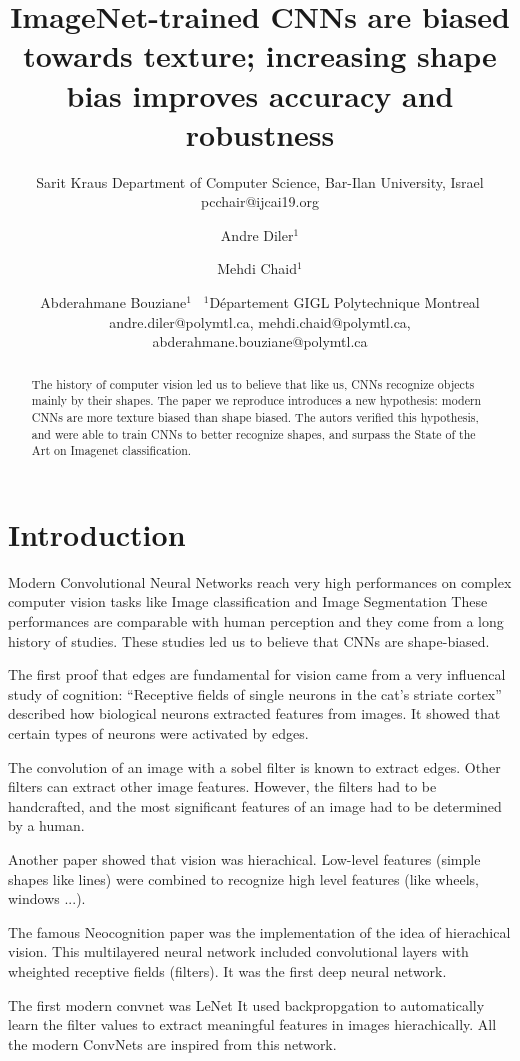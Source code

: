 \documentclass{article}
\title{ImageNet-trained CNNs are biased towards texture; increasing shape bias improves accuracy and robustness}
\author{
    Sarit Kraus
    \affiliations
    Department of Computer Science, Bar-Ilan University, Israel \emails
    pcchair@ijcai19.org
}
\author{
Andre Diler$^1$
\and
Mehdi Chaid$^1$\and
Abderahmane Bouziane$^1$\
\affiliations
$^1$Département GIGL Polytechnique Montreal\\
\emails
andre.diler@polymtl.ca,
mehdi.chaid@polymtl.ca,
abderahmane.bouziane@polymtl.ca
}
\begin{document}
\maketitle

\begin{abstract}
The history of computer vision led us to believe that like us, CNNs recognize 
objects mainly by their shapes. The paper we reproduce introduces a new hypothesis: modern
CNNs are more texture biased than shape biased. The autors verified this hypothesis, and were
able to train CNNs to better recognize shapes, and surpass the State of the Art on Imagenet classification.
\end{abstract}

\section{Introduction}


Modern Convolutional Neural Networks reach very high performances on complex computer vision tasks like
Image classification and Image Segmentation
These performances are comparable with human perception and they come from a long history of studies.
These studies led us to believe that CNNs are shape-biased.


The first proof that edges are fundamental for vision came from a very influencal study of cognition:
  “Receptive fields of single neurons in the cat’s striate cortex”
described how biological neurons extracted features from images. It showed that certain types of
neurons were activated by edges.

The convolution of an image with a sobel filter is known to extract edges.
Other filters can extract other image features. However, the filters had to be handcrafted, and
the most significant features of an image had to be determined by a human.

Another paper showed that vision was hierachical. Low-level features (simple shapes like lines)
were combined to recognize high level features (like wheels, windows ...).

The famous Neocognition paper was the implementation of the idea of hierachical vision.
This multilayered neural network included convolutional layers with wheighted receptive fields (filters).
It was the first deep neural network.

The first modern convnet was LeNet \cite{Lecun98gradient-basedlearning}
It used backpropgation to automatically learn the filter values to extract meaningful features in images hierachically.
All the modern ConvNets are inspired from this network.
\end{document}
